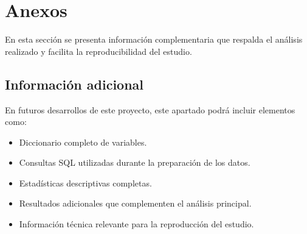 \chapter{Anexos}

En esta sección se presenta información complementaria que respalda el análisis realizado y facilita la reproducibilidad del estudio.

\section{Información adicional}

En futuros desarrollos de este proyecto, este apartado podrá incluir elementos como:

\begin{itemize}

\item Diccionario completo de variables.

\item Consultas SQL utilizadas durante la preparación de los datos.

\item Estadísticas descriptivas completas.

\item Resultados adicionales que complementen el análisis principal.

\item Información técnica relevante para la reproducción del estudio.

\end{itemize}